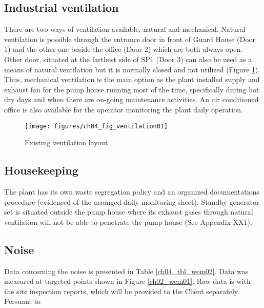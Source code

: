 \subsection{Industrial ventilation}\label{aq04}
There are two ways of ventilation available, natural and mechanical. Natural ventilation is possible through the entrance door in front of Guard House (Door 1) and the other one beside the office (Door 2) which are both always open. Other door, situated at the farthest side of SP1 (Door 3) can also be used as a means of natural ventilation but it is normally closed and not utilized (Figure \ref{ch04_fig_ventilation01}). Thus, mechanical ventilation is the main option as the plant installed supply and exhaust fan for the pump house running most of the time, specifically during hot dry days and when there are on-going maintenance activities. An air conditioned office is also available for the operator monitoring the plant daily operation.

\begin{figure}[!htb]
	\texttt{[image: figures/ch04\_fig\_ventilation01]} \\
	\caption{Existing ventilation layout}
	\label{ch04_fig_ventilation01} 
\end{figure}

\subsection{Housekeeping}\label{aq05}
The plant has its own waste segregation policy and an organized documentations procedure (evidenced of the arranged daily monitoring sheet). Standby generator set is situated outside the pump house where its exhaust gases through natural ventilation will not be able to penetrate the pump house (See Appendix XX1). 


\subsection{Noise}\label{aq06}
Data concerning the noise is presented in Table \ref{ch04_tbl_wem02}. Data was measured at targeted points shown in Figure \ref{ch02_wem01}. Raw data is with the site inspection reports, which will be provided to the Client separately. Persuant to 

